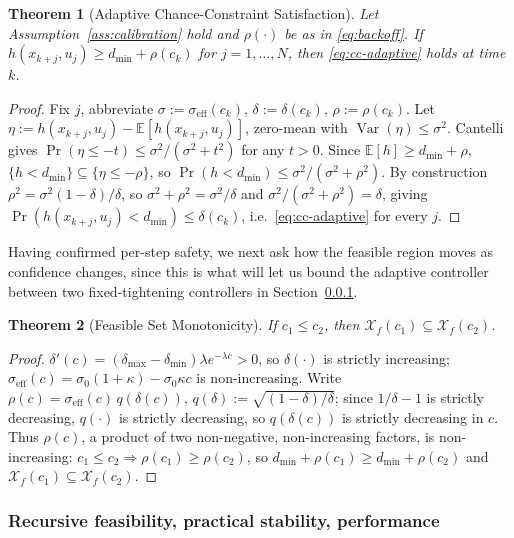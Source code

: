 \documentclass[letterpaper, 10 pt, conference]{ieeeconf}
\newtheorem{theorem}{Theorem}
\begin{document}
\begin{theorem}[Adaptive Chance-Constraint Satisfaction]
\label{thm:cc}
Let Assumption~\ref{ass:calibration} hold and $\rho(\cdot)$ be as in \eqref{eq:backoff}. If $h(x_{k+j},u_j) \ge d_{\min}+\rho(c_k)$ for $j=1,\dots,N$, then \eqref{eq:cc-adaptive} holds at time $k$.
\end{theorem}
\begin{proof}
Fix $j$, abbreviate $\sigma:=\sigma_{\mathrm{eff}}(c_k)$, $\delta:=\delta(c_k)$, $\rho:=\rho(c_k)$. Let $\eta:=h(x_{k+j},u_j)-\mathbb E[h(x_{k+j},u_j)]$, zero-mean with $\operatorname{Var}(\eta)\le\sigma^2$. Cantelli gives $\Pr(\eta\le-t)\le\sigma^2/(\sigma^2+t^2)$ for any $t>0$. Since $\mathbb E[h]\ge d_{\min}+\rho$, $\{h<d_{\min}\}\subseteq\{\eta\le-\rho\}$, so $\Pr(h<d_{\min})\le\sigma^2/(\sigma^2+\rho^2)$. By construction $\rho^2=\sigma^2(1-\delta)/\delta$, so $\sigma^2+\rho^2=\sigma^2/\delta$ and $\sigma^2/(\sigma^2+\rho^2)=\delta$, giving $\Pr(h(x_{k+j},u_j)<d_{\min})\le\delta(c_k)$, i.e.\ \eqref{eq:cc-adaptive} for every $j$.
\end{proof}

Having confirmed per-step safety, we next ask how the feasible region moves as confidence changes, since this is what will let us bound the adaptive controller between two fixed-tightening controllers in Section~\ref{sec:feasibility}.

\begin{theorem}[Feasible Set Monotonicity]
\label{thm:feasible}
If $c_1 \le c_2$, then $\mathcal X_f(c_1) \subseteq \mathcal X_f(c_2)$.
\end{theorem}
\begin{proof}
$\delta'(c)=(\delta_{\max}-\delta_{\min})\lambda e^{-\lambda c}>0$, so $\delta(\cdot)$ is strictly increasing; $\sigma_{\mathrm{eff}}(c)=\sigma_0(1+\kappa)-\sigma_0\kappa c$ is non-increasing. Write $\rho(c)=\sigma_{\mathrm{eff}}(c)\,q(\delta(c))$, $q(\delta):=\sqrt{(1-\delta)/\delta}$; since $1/\delta-1$ is strictly decreasing, $q(\cdot)$ is strictly decreasing, so $q(\delta(c))$ is strictly decreasing in $c$. Thus $\rho(c)$, a product of two non-negative, non-increasing factors, is non-increasing: $c_1\le c_2 \Rightarrow \rho(c_1)\ge\rho(c_2)$, so $d_{\min}+\rho(c_1)\ge d_{\min}+\rho(c_2)$ and $\mathcal X_f(c_1)\subseteq\mathcal X_f(c_2)$.
\end{proof}

\subsubsection{Recursive feasibility, practical stability, performance}
\label{sec:feasibility}
\end{document}
